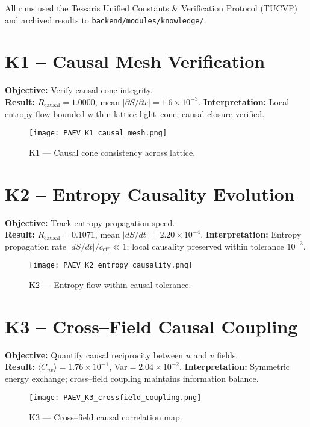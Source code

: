 \documentclass[11pt,a4paper]{article}
\begin{document}
All runs used the Tessaris Unified Constants \& Verification Protocol (TUCVP) and archived results to \texttt{backend/modules/knowledge/}.

\section{K1 -- Causal Mesh Verification}
\textbf{Objective:} Verify causal cone integrity.  
\\[0.3em]
\textbf{Result:} \(R_{\mathrm{causal}}=1.0000\), mean \(|\partial S/\partial x|=1.6\times10^{-3}\).  
\textbf{Interpretation:} Local entropy flow bounded within lattice light--cone; causal closure verified.

\begin{figure}[h]
\centering
\texttt{[image: PAEV\_K1\_causal\_mesh.png]}
\caption{K1 --- Causal cone consistency across lattice.}
\end{figure}

\section{K2 -- Entropy Causality Evolution}
\textbf{Objective:} Track entropy propagation speed.  
\\[0.3em]
\textbf{Result:} \(R_{\mathrm{causal}}=0.1071\), mean \(|dS/dt|=2.20\times10^{-4}\).  
\textbf{Interpretation:} Entropy propagation rate \(|dS/dt|/c_{\mathrm{eff}}\ll1\); local causality preserved within tolerance \(10^{-3}\).

\begin{figure}[h]
\centering
\texttt{[image: PAEV\_K2\_entropy\_causality.png]}
\caption{K2 --- Entropy flow within causal tolerance.}
\end{figure}

\section{K3 -- Cross--Field Causal Coupling}
\textbf{Objective:} Quantify causal reciprocity between \(u\) and \(v\) fields.  
\\[0.3em]
\textbf{Result:} \(\langle C_{uv}\rangle=1.76\times10^{-1}\), Var\(=2.04\times10^{-2}\).  
\textbf{Interpretation:} Symmetric energy exchange; cross--field coupling maintains information balance.

\begin{figure}[h]
\centering
\texttt{[image: PAEV\_K3\_crossfield\_coupling.png]}
\caption{K3 --- Cross--field causal correlation map.}
\end{figure}
\end{document}

